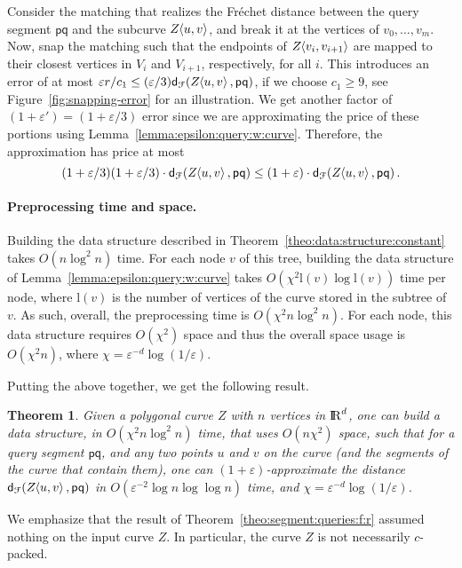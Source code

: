 \documentclass[12pt]{article}
\newtheorem{theorem}{Theorem}[section]
\newcommand{\thmlab}[1]{{\label{theo:#1}}}
\newcommand{\thmref}[1]{Theorem~\ref{theo:#1}}
\newcommand{\lemref}[1]{Lemma~\ref{lemma:#1}}
\newcommand{\figref}[1]{Figure~\ref{fig:#1}}
\newcommand{\ts}{\hspace{0.6pt}}
\newcommand{\Frechet}{Fr\'{e}c{h}e{}t\xspace}\providecommand{\Arr}{\mathop{\mathrm{\EuScript{A}}}}
\newcommand{\distFr}[2]{\mathsf{d}_{\EuScript{F}}\pth{#1, #2}}
\newcommand{\pnt}{\mathsf{p}}
\newcommand{\pntA}{\mathsf{q}}
\newcommand{\cZ}{{Z}}
\providecommand{\pth}[2][\!]{#1\left({#2}\right)}
\newcommand{\constA}{c_1}
\providecommand{\eps}{{\varepsilon}}\renewcommand{\Re}{{\rm I\!\hspace{-0.025em} R}}
\newcommand{\SC}[3]{{#1}\!\!\ts\ts \left\langle  #2, #3 \right\rangle}
\newcommand{\lNode}[1]{\mathrm{l}\pth{#1}}
\numberwithin{figure}{section}
\numberwithin{equation}{section}
\newcommand{\GridCompl}{\ensuremath{\chi}}
\newcommand{\NgridCompl}{\ensuremath{\eps^{-d}\log(1/\eps)}}
\newcommand{\matching}{matching\xspace}
\begin{document}
Consider the \matching{} that realizes the \Frechet distance between
the query segment $\pnt \pntA$ and the subcurve $\SC{\cZ}{u}{v}$, and
break it at the vertices of $v_0, \ldots, v_m$. Now, snap the matching
such that the endpoints of $\SC{\cZ}{v_i}{v_{i+1}}$ are mapped to
their closest vertices in $V_i$ and $V_{i+1}$, respectively, for all
$i$. This introduces an error of at most $\eps r / \constA \leq
(\eps/3)\distFr{\SC{\cZ}{u}{v}}{\pnt\pntA}$, if we choose $\constA
\geq 9$, see \figref{snapping-error} for an illustration.  We get
another factor of $(1+\eps')=(1+\eps/3)$ error since we are
approximating the price of these portions using
\lemref{epsilon:query:w:curve}. Therefore, the approximation has price
at most
\[
(1+\eps/3)(1+\eps/3)\cdot\distFr{\SC{\cZ}{u}{v}}{\pnt\pntA} \leq
(1+\eps)\cdot\distFr{\SC{\cZ}{u}{v}}{\pnt\pntA}.\]


\paragraph{Preprocessing time and space.}
Building the data structure described in
\thmref{data:structure:constant} takes $O(n \log^2 n)$ time. For each
node $v$ of this tree, building the data structure of
\lemref{epsilon:query:w:curve} takes $O\pth{ \GridCompl^2 \lNode{v}
   \log \lNode{v} }$ time per node, where $\lNode{v}$ is the number of
vertices of the curve stored in the subtree of $v$. As such, overall,
the preprocessing time is $O\pth{\GridCompl^2 n \log^2 n }$. For each
node, this data structure requires $O\pth{ \GridCompl^2 }$ space and
thus the overall space usage is $O\pth{ \GridCompl^2 n }$, where
$\GridCompl = \NgridCompl$.




Putting the above together, we get the following result.

\begin{theorem}\thmlab{segment:queries:f:r}Given a polygonal curve $\cZ$ with $n$ vertices in $\Re^d$, one
    can build a data structure, in $O\pth{\GridCompl^2 n \log^2 n }$
    time, that uses $O\pth{n \GridCompl^2}$ space, such that for a
    query segment $\pnt \pntA$, and any two points $u$ and $v$ on the
    curve (and the segments of the curve that contain them), one can
    $(1+\eps)$-approximate the distance
    $\distFr{\SC{\cZ}{u}{v}}{\pnt\pntA}$ in $O\pth{ \eps^{-2} \log n
       \log\log n}$ time, and $\GridCompl=\NgridCompl$.
\end{theorem}

We emphasize that the result of \thmref{segment:queries:f:r} assumed
nothing on the input curve $\cZ$. In particular, the curve $\cZ$ is
not necessarily $c$-packed.
\end{document}
